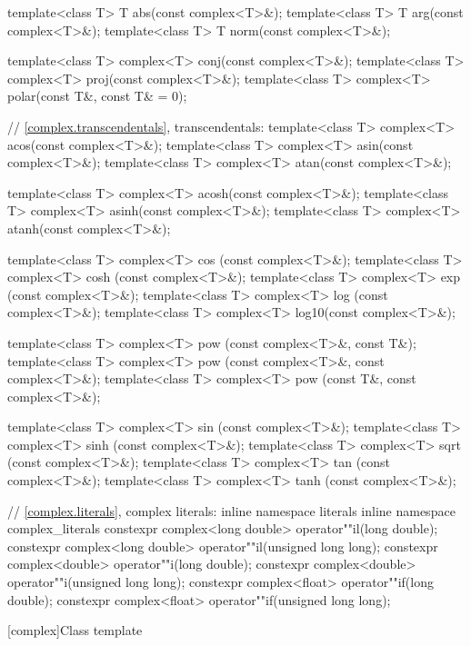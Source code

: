 \begin{codeblock}
{  template<class T> T abs(const complex<T>&);
  template<class T> T arg(const complex<T>&);
  template<class T> T norm(const complex<T>&);

  template<class T> complex<T> conj(const complex<T>&);
  template<class T> complex<T> proj(const complex<T>&);
  template<class T> complex<T> polar(const T&, const T& = 0);

  // \ref{complex.transcendentals}, transcendentals:
  template<class T> complex<T> acos(const complex<T>&);
  template<class T> complex<T> asin(const complex<T>&);
  template<class T> complex<T> atan(const complex<T>&);

  template<class T> complex<T> acosh(const complex<T>&);
  template<class T> complex<T> asinh(const complex<T>&);
  template<class T> complex<T> atanh(const complex<T>&);

  template<class T> complex<T> cos  (const complex<T>&);
  template<class T> complex<T> cosh (const complex<T>&);
  template<class T> complex<T> exp  (const complex<T>&);
  template<class T> complex<T> log  (const complex<T>&);
  template<class T> complex<T> log10(const complex<T>&);

  template<class T> complex<T> pow  (const complex<T>&, const T&);
  template<class T> complex<T> pow  (const complex<T>&, const complex<T>&);
  template<class T> complex<T> pow  (const T&, const complex<T>&);

  template<class T> complex<T> sin  (const complex<T>&);
  template<class T> complex<T> sinh (const complex<T>&);
  template<class T> complex<T> sqrt (const complex<T>&);
  template<class T> complex<T> tan  (const complex<T>&);
  template<class T> complex<T> tanh (const complex<T>&);

  // \ref{complex.literals}, complex literals:
  inline namespace literals {
    inline namespace complex_literals {
      constexpr complex<long double> operator""il(long double);
      constexpr complex<long double> operator""il(unsigned long long);
      constexpr complex<double> operator""i(long double);
      constexpr complex<double> operator""i(unsigned long long);
      constexpr complex<float> operator""if(long double);
      constexpr complex<float> operator""if(unsigned long long);
    }
  }
}
\end{codeblock}

[complex]{Class template }

